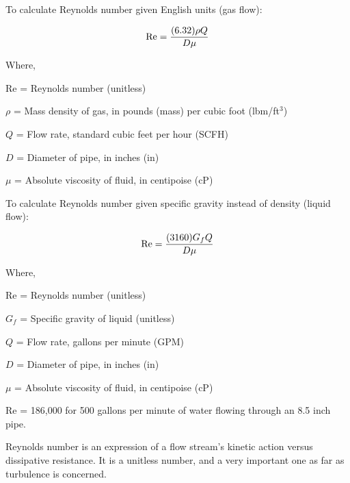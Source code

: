 To calculate Reynolds number given English units (gas flow):

$$\hbox{Re} = {{(6.32) \rho Q} \over {D \mu}}$$

\noindent
Where,

Re = Reynolds number (unitless)

$\rho$ = Mass density of gas, in pounds (mass) per cubic foot (lbm/ft$^{3}$)

$Q$ = Flow rate, standard cubic feet per hour (SCFH)

$D$ = Diameter of pipe, in inches (in)

$\mu$ = Absolute viscosity of fluid, in centipoise (cP)

\vskip 60pt \goodbreak

To calculate Reynolds number given specific gravity instead of density (liquid flow):

$$\hbox{Re} = {{(3160) G_f Q} \over {D \mu}}$$

\noindent
Where,

Re = Reynolds number (unitless)

$G_f$ = Specific gravity of liquid (unitless)

$Q$ = Flow rate, gallons per minute (GPM)

$D$ = Diameter of pipe, in inches (in)

$\mu$ = Absolute viscosity of fluid, in centipoise (cP)

\vskip 60pt \goodbreak

Re = 186,000 for 500 gallons per minute of water flowing through an 8.5 inch pipe.







Reynolds number is an expression of a flow stream's kinetic action versus dissipative resistance.  It is a unitless number, and a very important one as far as turbulence is concerned.




